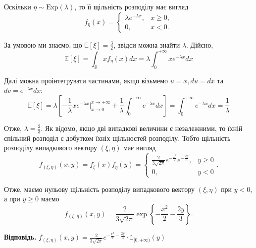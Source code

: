 \documentclass[14pt]{extarticle}
\newcommand{\<}{\langle}
\renewcommand{\>}{\rangle}
\theoremstyle{mystyle}{\newtheorem{definition}{Definition}[section]}
\theoremstyle{mystyle}{\newtheorem{proposition}[definition]{Proposition}}
\theoremstyle{mystyle}{\newtheorem{theorem}[definition]{Theorem}}
\theoremstyle{mystyle}{\newtheorem{lemma}[definition]{Lemma}}
\theoremstyle{mystyle}{\newtheorem{corollary}[definition]{Corollary}}
\theoremstyle{mystyle}{\newtheorem*{remark}{Remark}}
\theoremstyle{mystyle}{\newtheorem*{remarks}{Remarks}}
\theoremstyle{mystyle}{\newtheorem*{example}{Example}}
\theoremstyle{mystyle}{\newtheorem*{examples}{Examples}}
\theoremstyle{definition}{\newtheorem*{exercise}{Exercise}}
\theoremstyle{cstyle}{\newtheorem*{cthm}{}}
\theoremstyle{warn}
\begin{document}
Оскільки $\eta \sim \text{Exp}(\lambda)$, то її щільність розподілу має вигляд
\begin{equation}
    f_{\eta}(x) = \begin{cases}
        \lambda e^{-\lambda x}, & x \geq 0, \\
        0, & x < 0.
    \end{cases}
\end{equation}

За умовою ми знаємо, що $\mathbb{E}[\xi]=\frac{3}{2}$, звідси можна знайти $\lambda$. Дійсно,
\begin{equation}
    \mathbb{E}[\xi] = \int_{\mathbb{R}}xf_{\eta}(x)dx = \lambda\int_0^{+\infty} xe^{-\lambda x}dx
\end{equation}

Далі можна проінтегрувати частинами, якщо візьмемо $u=x,du=dx$ та $dv=e^{-\lambda x}dx$:
\begin{equation}
    \mathbb{E}[\xi] = \lambda\left[-\frac{1}{\lambda}xe^{-\lambda x}\Big|_{x \to 0}^{x \to +\infty} + \frac{1}{\lambda}\int_0^{+\infty}e^{-\lambda x}dx\right] = \int_0^{+\infty}e^{-\lambda x}dx = \frac{1}{\lambda}
\end{equation}

Отже, $\lambda = \frac{2}{3}$. Як відомо, якщо дві випадкові величини є незалежними, то їхній спільний розподіл є добутком їхніх щільностей розподілу. Тобто щільність розподілу випадкового вектору $(\xi,\eta)$ має вигляд
\begin{equation}
    f_{(\xi,\eta)}(x,y) = f_{\xi}(x)f_{\eta}(y) = \begin{cases}
        \frac{2}{3\sqrt{2\pi}}e^{-\frac{x^2}{2}}e^{-\frac{2y}{3}}, & y \geq 0 \\
        0, & y < 0
    \end{cases}.
\end{equation}

Отже, маємо нульову щільність розподілу випадкового вектору $(\xi,\eta)$ при $y < 0$, а при $y \geq 0$ маємо
\begin{equation}
    f_{(\xi,\eta)}(x,y) = \frac{2}{3\sqrt{2\pi}}\exp\left\{-\frac{x^2}{2} - \frac{2y}{3}\right\}.
\end{equation}

\textbf{Відповідь.} $f_{(\xi,\eta)}(x,y) = \frac{2}{3\sqrt{2\pi}}e^{-\frac{x^2}{2} - \frac{2y}{3}} \cdot \mathds{1}_{[0,+\infty)}(y)$
\end{document}

